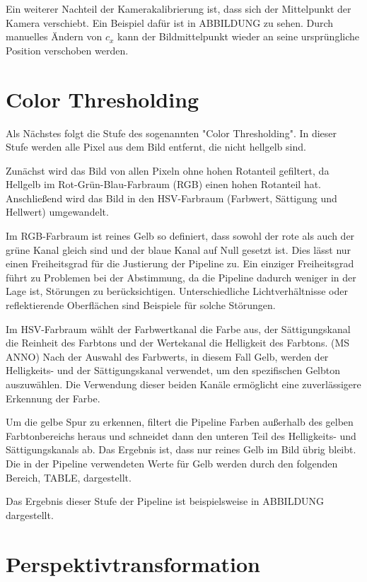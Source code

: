 \documentclass[arbeit=studie,oneside,BCOR=12mm]{ArbeitRST}
\begin{document}
Ein weiterer Nachteil der Kamerakalibrierung ist, dass sich der Mittelpunkt der
Kamera verschiebt. Ein Beispiel dafür ist in ABBILDUNG zu sehen. Durch
manuelles Ändern von $c_x$ kann der Bildmittelpunkt wieder an seine
ursprüngliche Position verschoben werden.


\section{\glqq Color Thresholding\grqq}

Als Nächstes folgt die Stufe des sogenannten "Color Thresholding". In dieser
Stufe werden alle Pixel aus dem Bild entfernt, die nicht hellgelb sind.

Zunächst wird das Bild von allen Pixeln ohne hohen Rotanteil gefiltert, da
Hellgelb im Rot-Grün-Blau-Farbraum (RGB) einen hohen Rotanteil hat.
Anschließend wird das Bild in den HSV-Farbraum (Farbwert, Sättigung und
Hellwert) umgewandelt. 

Im RGB-Farbraum ist reines Gelb so definiert, dass sowohl der rote als auch der
grüne Kanal gleich sind und der blaue Kanal auf Null gesetzt ist. Dies lässt
nur einen Freiheitsgrad für die Justierung der Pipeline zu.  Ein einziger
Freiheitsgrad führt zu Problemen bei der Abstimmung, da die Pipeline dadurch
weniger in der Lage ist, Störungen zu berücksichtigen. Unterschiedliche
Lichtverhältnisse oder reflektierende Oberflächen sind Beispiele für solche
Störungen.

Im HSV-Farbraum wählt der Farbwertkanal die Farbe aus, der Sättigungskanal die
Reinheit des Farbtons und der Wertekanal die Helligkeit des Farbtons. (MS ANNO)
Nach der Auswahl des Farbwerts, in diesem Fall Gelb, werden der Helligkeits-
und der Sättigungskanal verwendet, um den spezifischen Gelbton auszuwählen. Die
Verwendung dieser beiden Kanäle ermöglicht eine zuverlässigere Erkennung der
Farbe.

Um die gelbe Spur zu erkennen, filtert die Pipeline Farben außerhalb des gelben
Farbtonbereichs heraus und schneidet dann den unteren Teil des Helligkeits- und
Sättigungskanals ab. Das Ergebnis ist, dass nur reines Gelb im Bild übrig
bleibt. Die in der Pipeline verwendeten Werte für Gelb werden durch den
folgenden Bereich, TABLE, dargestellt.

Das Ergebnis dieser Stufe der Pipeline ist beispielsweise in ABBILDUNG
dargestellt.

\section{Perspektivtransformation}
\end{document}
